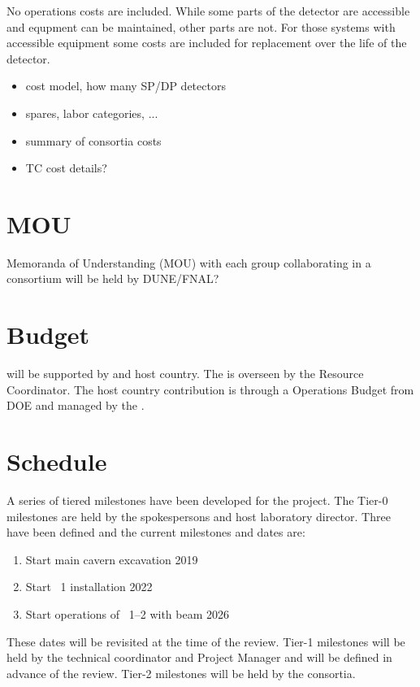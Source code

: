 No operations costs are included. While some parts of the detector are
accessible and equpment can be maintained, other parts are not. For
those systems with accessible equipment some costs are included for
replacement over the life of the detector.

\begin{itemize}
 \item cost model, how many SP/DP detectors
 \item spares, labor categories, ...
 \item summary of consortia costs
 \item TC cost details?
\end{itemize}

\section{MOU}
\label{sec:fdsp-coord-mou}

Memoranda of Understanding (MOU) with each group collaborating in a
consortium will be held by DUNE/FNAL?

\section{Budget}
\label{sec:fdsp-coord-budget}

  will be supported by  and host
country. The  is overseen by the Resource Coordinator. The
host country contribution is through a 
Operations Budget from DOE and managed by the .

\section{Schedule}
\label{sec:fdsp-coord-controls}

A series of tiered milestones have been developed for the 
project. The Tier-0 milestones are held by the spokespersons and host
laboratory director. Three have been defined and the current milestones and
dates are:
\begin{enumerate}
\item Start main cavern excavation \hspace{2.58in} 2019
\item Start ~1 installation \hspace{2.1in} 2022
\item Start operations of ~1--2 with beam \hspace{1in} 2026
\end{enumerate}
These dates will be revisited at the time of the  review.  Tier-1
milestones will be held by the technical coordinator and  Project
Manager and will be defined in advance of the  review. Tier-2
milestones will be held by the consortia.

